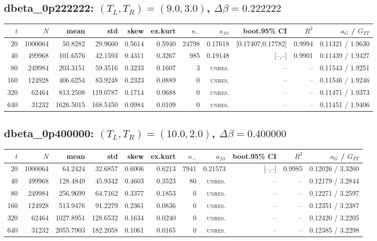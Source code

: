 \documentclass[10pt]{article}
\begin{document}
\subsection*{dbeta\_0p222222: $(T_L,T_R)=(9.0,3.0)$, $\Delta\beta=0.222222$}
\scriptsize\begin{longtable}{rrrrrrrrrrr}
\toprule $t$ & $N$ & mean & std & skew & ex.kurt & $n_-$ & $a_{fit}$ & boot.95\% CI & $R^2$ & $a_G$ / $G_{FT}$ \\
\midrule\endhead
20 & 1000064 & 50.8282 & 29.9660 & 0.5614 & 0.5940 & 24798 & 0.17618 & [0.17407,0.17782] & 0.9994 & 0.11321 / 1.9630 \\
40 & 499968 & 101.6576 & 42.1593 & 0.4311 & 0.3267 & 985 & 0.19148 & [--,--] & 0.9901 & 0.11439 / 1.9427 \\
80 & 249984 & 203.3151 & 59.3516 & 0.3233 & 0.1607 & 3 & \textsc{unres.} & -- & -- & 0.11543 / 1.9251 \\
160 & 124928 & 406.6254 & 83.9248 & 0.2323 & 0.0889 & 0 & \textsc{unres.} & -- & -- & 0.11546 / 1.9246 \\
320 & 62464 & 813.2508 & 119.0787 & 0.1714 & 0.0688 & 0 & \textsc{unres.} & -- & -- & 0.11471 / 1.9373 \\
640 & 31232 & 1626.5015 & 168.5450 & 0.0984 & 0.0109 & 0 & \textsc{unres.} & -- & -- & 0.11451 / 1.9406 \\
\bottomrule\end{longtable}\normalsize
\subsection*{dbeta\_0p400000: $(T_L,T_R)=(10.0,2.0)$, $\Delta\beta=0.400000$}
\scriptsize\begin{longtable}{rrrrrrrrrrr}
\toprule $t$ & $N$ & mean & std & skew & ex.kurt & $n_-$ & $a_{fit}$ & boot.95\% CI & $R^2$ & $a_G$ / $G_{FT}$ \\
\midrule\endhead
20 & 1000064 & 64.2424 & 32.6857 & 0.6006 & 0.6213 & 7941 & 0.21573 & [--,--] & 0.9985 & 0.12026 / 3.3260 \\
40 & 499968 & 128.4849 & 45.9342 & 0.4603 & 0.3523 & 80 & \textsc{unres.} & -- & -- & 0.12179 / 3.2844 \\
80 & 249984 & 256.9699 & 64.7162 & 0.3377 & 0.1853 & 0 & \textsc{unres.} & -- & -- & 0.12271 / 3.2597 \\
160 & 124928 & 513.9476 & 91.2279 & 0.2361 & 0.0836 & 0 & \textsc{unres.} & -- & -- & 0.12351 / 3.2387 \\
320 & 62464 & 1027.8951 & 128.6532 & 0.1634 & 0.0240 & 0 & \textsc{unres.} & -- & -- & 0.12420 / 3.2205 \\
640 & 31232 & 2055.7903 & 182.2058 & 0.1061 & 0.0165 & 0 & \textsc{unres.} & -- & -- & 0.12385 / 3.2298 \\
\bottomrule\end{longtable}\normalsize
\end{document}
